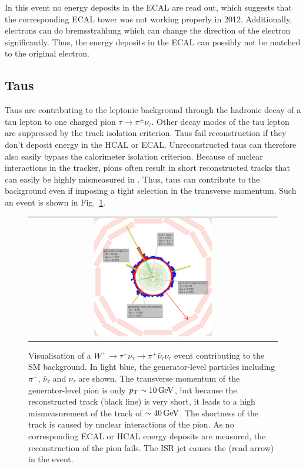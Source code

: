 In this event no energy deposits in the ECAL are read out, which suggests that the corresponding ECAL tower was not working properly in 2012.
Additionally, electrons can do bremsstrahlung which can change the direction of the electron significantly.
Thus, the energy deposits in the ECAL can possibly not be matched to the original electron.

\subsection*{Taus}
Taus are contributing to the leptonic background through the hadronic decay of a tau lepton to one charged pion $\tau\rightarrow\pi^{\pm}\nu_{\tau}$.
Other decay modes of the tau lepton are suppressed by the track isolation criterion.
Taus fail reconstruction if they don't deposit energy in the HCAL or ECAL.
Unreconstructed taus can therefore also easily bypass the calorimeter isolation criterion.
Because of nuclear interactions in the tracker, pions often result in short reconstructed tracks that can easily be highly mismeasured in \pt.
Thus, taus can contribute to the background even if imposing a tight selection in the transverse momentum.
Such an event is shown in Fig.~\ref{fig:LostTau}.  
\begin{figure}[!tb]
  \centering 
  \begin{tabular}{c}
    \includegraphics[width=0.49\textwidth]{figures/analysis/Background/LostTau_lumi_20940_event_8369426.png}
  \end{tabular}
  \caption{Visualisation of a $W^{+}\rightarrow \tau^{+}\nu_{\tau} \rightarrow \pi^{+}\bar{\nu}_{\tau} \nu_{\tau} $ event contributing to the SM background. 
           In light blue, the generator-level particles including $\pi^{+}$, $\bar{\nu}_{\tau}$ and $\nu_{\tau}$ are shown.
           The transverse momentum of the generator-level pion is only $p_{\text{T}}\sim10\,\text{Ge}\kern-0.06667em\text{V}$, but because the reconstructed track (black line) is very short, it leads to a high mismeasurement of the track \pt of $\sim40\,\text{Ge}\kern-0.06667em\text{V}$.
           The shortness of the track is caused by nuclear interactions of the pion.
           As no corresponding ECAL or HCAL energy deposits are measured, the reconstruction of the pion fails.
           The ISR jet causes the \met (read arrow) in the event. }
  \label{fig:LostTau}
\end{figure}

